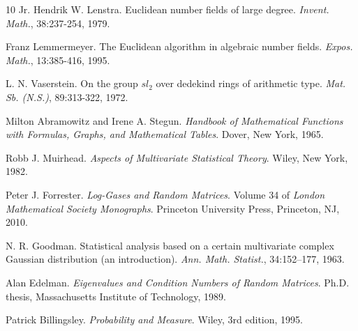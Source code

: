 \documentclass[11pt,a4paper]{article}
\theoremstyle{plain}
\theoremstyle{definition}
\theoremstyle{remark}
\begin{document}
\begin{thebibliography}{10}
Jr. Hendrik W. Lenstra.
 Euclidean number fields of large degree.
 {\em Invent.  Math.}, 38:237-254, 1979.

Franz Lemmermeyer.
 The {E}uclidean algorithm in algebraic number fields.
 {\em Expos.  Math.}, 13:385-416, 1995.

L. N. Vaserstein.
 On the group $sl_2$ over dedekind rings of arithmetic type.
 {\em Mat.  Sb.  (N.S.)}, 89:313-322, 1972.

Milton Abramowitz and Irene A. Stegun.
 {\em Handbook of Mathematical Functions with Formulas, Graphs, and Mathematical Tables}.
 Dover, New York, 1965.

Robb J. Muirhead.
 {\em Aspects of Multivariate Statistical Theory}.
 Wiley, New York, 1982.

Peter J. Forrester.
 {\em Log-Gases and Random Matrices}.
 Volume 34 of {\em London Mathematical Society Monographs}.
 Princeton University Press, Princeton, NJ, 2010.

N. R. Goodman.
 Statistical analysis based on a certain multivariate complex Gaussian
 distribution (an introduction).
 {\em Ann. Math. Statist.}, 34:152--177, 1963.

Alan Edelman.
 {\em Eigenvalues and Condition Numbers of Random Matrices}.
 Ph.D. thesis, Massachusetts Institute of Technology, 1989.

 Patrick Billingsley. {\it  Probability and Measure}. Wiley, 3rd edition, 1995.

\end{thebibliography}
\end{document}
